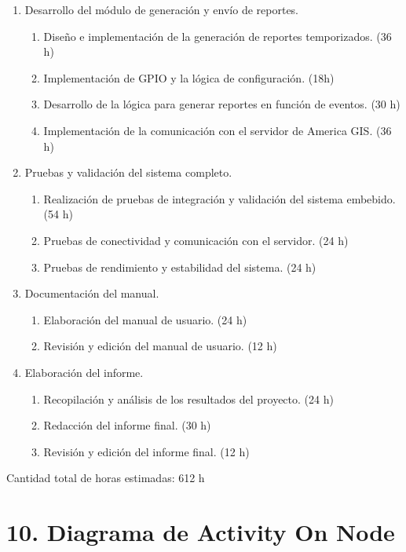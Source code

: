 \documentclass[
11pt, %
codirector, %
]{charter}
\begin{document}
\begin{enumerate}
    \item Desarrollo del módulo de generación y envío de reportes.
    \begin{enumerate}
        \item Diseño e implementación de la generación de reportes temporizados. (36 h)
        \item Implementación de GPIO y la lógica de configuración. (18h)
        \item Desarrollo de la lógica para generar reportes en función de eventos. (30 h)
        \item Implementación de la comunicación con el servidor de America GIS. (36 h)
    \end{enumerate}
    
    \item Pruebas y validación del sistema completo.
    \begin{enumerate}
        \item Realización de pruebas de integración y validación del sistema embebido. (54 h)
        \item Pruebas de conectividad y comunicación con el servidor. (24 h)
        \item Pruebas de rendimiento y estabilidad del sistema. (24 h)
    \end{enumerate}
    
    \item Documentación del manual.
    \begin{enumerate}
        \item Elaboración del manual de usuario. (24 h)
        \item Revisión y edición del manual de usuario. (12 h)
    \end{enumerate}
    
    \item Elaboración del informe.
    \begin{enumerate}
        \item Recopilación y análisis de los resultados del proyecto. (24 h)
        \item Redacción del informe final. (30 h)
        \item Revisión y edición del informe final. (12 h)
    \end{enumerate}
\end{enumerate}

Cantidad total de horas estimadas: 612 h

\pagebreak
\section{10. Diagrama de Activity On Node}
\label{sec:AoN}
\end{document}
